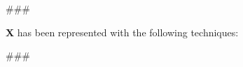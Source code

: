 
\usepackage{comment}


###

\textbf{X} has been represented with the following techniques:
\hfill\break
\hfill\break

###



\begin{comment}
Author = DIEGO MICCOLI
Alias = Kozen88
Organization = SWAP Research Group UniBa
Date = 27-12-2023

This mini template is not working by itself because there are latex command missing needed
to compile the file and give as output a pdf file, in addition it has been added jinja
statement in order to control the rendering of the latex file with the jinja library, for these
reasons it needs to be used with the other mini chunks in conjunction.
\end{comment}
